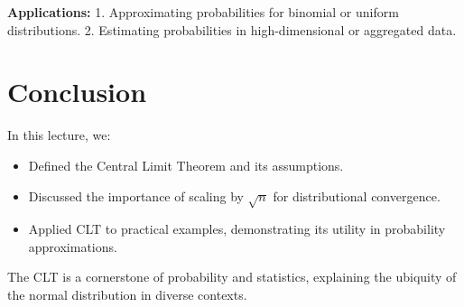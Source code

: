 \documentclass{article}
\begin{document}
\textbf{Applications:}
1. Approximating probabilities for binomial or uniform distributions.
2. Estimating probabilities in high-dimensional or aggregated data.

\section*{Conclusion}

In this lecture, we:
\begin{itemize}
  \item Defined the Central Limit Theorem and its assumptions.
  \item Discussed the importance of scaling by $\sqrt{n}$ for distributional convergence.
  \item Applied CLT to practical examples, demonstrating its utility in probability approximations.
\end{itemize}

The CLT is a cornerstone of probability and statistics, explaining the ubiquity of the normal distribution in diverse contexts.
\end{document}
